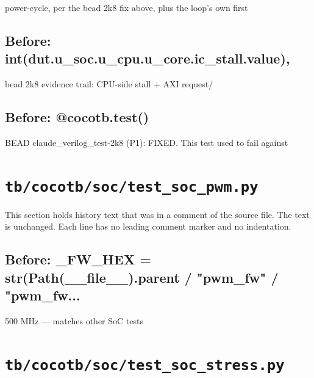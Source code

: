 \begin{record}
\begin{textblock}
power-cycle, per the bead 2k8 fix above, plus the loop's own first
\end{textblock}

\subsection*{Before: int(dut.u\_soc.u\_cpu.u\_core.ic\_stall.value),}

\begin{textblock}
bead 2k8 evidence trail: CPU-side stall + AXI request/
\end{textblock}

\subsection*{Before: @cocotb.test()}

\begin{textblock}
BEAD claude_verilog_test-2k8 (P1): FIXED. This test used to fail against
\end{textblock}

\end{record}

\section{\texttt{tb/cocotb/soc/test\_soc\_pwm.py}}\label{cr:suite:soc-test-soc-pwm}

This section holds history text that was in a comment of the source file. The text is unchanged. Each line has no leading comment marker and no indentation.

\begin{record}

\subsection*{Before: \_FW\_HEX = str(Path(\_\_file\_\_).parent / "pwm\_fw" / "pwm\_fw...}

\begin{textblock}
500 MHz — matches other SoC tests
\end{textblock}

\end{record}

\section{\texttt{tb/cocotb/soc/test\_soc\_stress.py}}\label{cr:suite:soc-test-soc-stress}

